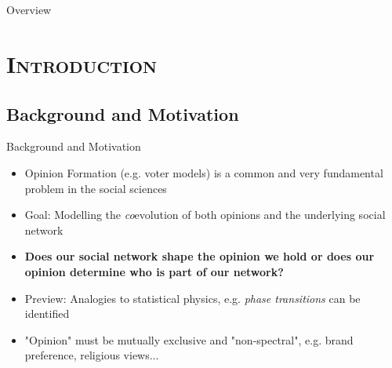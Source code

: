 \documentclass[xcolor=x11names,compress]{beamer}
\renewcommand{\(}{\begin{columns}}
\renewcommand{\)}{\end{columns}}
\newcommand{\<}[1]{\begin{column}{#1}}
\renewcommand{\>}{\end{column}}
\begin{document}
\section{}

\section{}
\begin{frame}{Overview}
\tableofcontents
\end{frame}

\section{\scshape Introduction}
\subsection{Background and Motivation}
\begin{frame}{Background and Motivation}
\begin{itemize}

\item Opinion Formation (e.g. voter models) is a common and very fundamental problem in the social sciences

\item Goal: Modelling the \emph{co}evolution of both opinions and the underlying social network

\item \textbf{Does our social network shape the opinion we hold or does our opinion determine who is part of our network?}
\item Preview: Analogies to statistical physics, e.g. \emph{phase transitions} can be identified


\vspace{0.2in}

\item "Opinion" must be mutually exclusive and "non-spectral", e.g. brand preference, religious views...

\end{itemize}
\end{frame}
\end{document}
